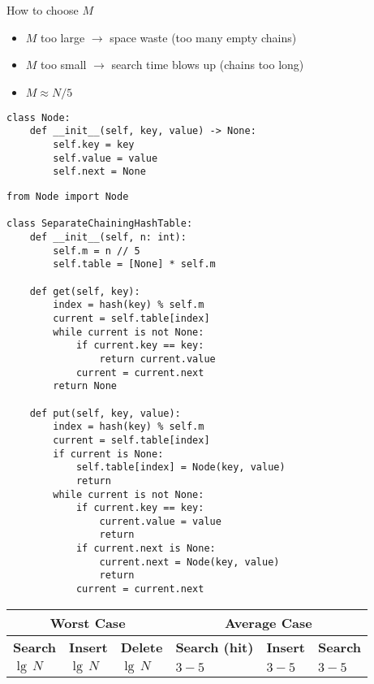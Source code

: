 \documentclass[a4paper]{article}
\begin{document}
How to choose $M$
\begin{itemize}
    \item $M$ too large $\to$ space waste (too many empty chains)
    \item $M$ too small $\to$ search time blows up (chains too long)
    \item $M\approx N/5$
\end{itemize}

\begin{lstlisting}
class Node:
    def __init__(self, key, value) -> None:
        self.key = key
        self.value = value
        self.next = None
\end{lstlisting}

\begin{lstlisting}
from Node import Node

class SeparateChainingHashTable:
    def __init__(self, n: int):
        self.m = n // 5
        self.table = [None] * self.m

    def get(self, key):
        index = hash(key) % self.m
        current = self.table[index]
        while current is not None:
            if current.key == key:
                return current.value
            current = current.next
        return None

    def put(self, key, value):
        index = hash(key) % self.m
        current = self.table[index]
        if current is None:
            self.table[index] = Node(key, value)
            return
        while current is not None:
            if current.key == key:
                current.value = value
                return
            if current.next is None:
                current.next = Node(key, value)
                return
            current = current.next
\end{lstlisting}

\begin{spacing}{1.5}
\begin{tabularx}{1\textwidth}{|X|X|X|X|X|X|}
    \hline
    \multicolumn{3}{|c|}{\textbf{Worst Case}} &\multicolumn{3}{c|}{\textbf{Average Case}}\\
    \hline
    \textbf{Search} & \textbf{Insert} & \textbf{Delete} & \textbf{Search (hit)} & \textbf{Insert} & \textbf{Search}\\
    \hline
    $\lg\,N$&$\lg\,N$&$\lg\,N$&$3-5$&$3-5$&$3-5$\\
    \hline
\end{tabularx}
\end{spacing}
\end{document}
